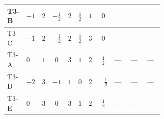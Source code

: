 \documentclass[8pt]{article}
\begin{document}
\begin{landscape}
\begin{longtable}{@{}llcccccc >{\raggedright\arraybackslash}p{0.21\linewidth} >{\raggedright\arraybackslash}p{0.21\linewidth} >{\raggedright\arraybackslash}p{0.21\linewidth}@{}}
T3-B & $-1$ & $2$ & $-\frac{1}{2}$ & $2$ & $\frac{1}{2}$ & $1$ & $0$ & \scriptsize\adjustbox{max width=\linewidth}{$\begin{gathered} 4 {\lambda_{H^\dagger H^\dagger S_1^\dagger S_1^\dagger}} \left({\lambda_{H^\dagger H^\dagger S_2 S_2}}\right)^{*}\end{gathered}$} & \scriptsize\adjustbox{max width=\linewidth}{$\begin{gathered} -9 {g_2}^2 {\lambda_{S_1^{\dagger 2}S_2^{\dagger 2}}}\end{gathered}$} & \scriptsize\adjustbox{max width=\linewidth}{$\begin{gathered} -3 {g_Y}^2 {\lambda_{S_1^{\dagger 2}S_2^{\dagger 2}}}\end{gathered}$} \\
\midrule
T3-C & $-1$ & $2$ & $-\frac{1}{2}$ & $2$ & $\frac{1}{2}$ & $3$ & $0$ & \scriptsize\adjustbox{max width=\linewidth}{$\begin{gathered} 4 {\lambda_{H^\dagger H^\dagger S_1^\dagger S_1^\dagger}} \left({\lambda_{H^\dagger H^\dagger S_2 S_2}}\right)^{*}\end{gathered}$} & \scriptsize\adjustbox{max width=\linewidth}{$\begin{gathered} -9 {g_2}^2 {\lambda_{S_1^{\dagger 2}S_2^{\dagger 2}}}\end{gathered}$} & \scriptsize\adjustbox{max width=\linewidth}{$\begin{gathered} -3 {g_Y}^2 {\lambda_{S_1^{\dagger 2}S_2^{\dagger 2}}}\end{gathered}$} \\
\midrule
T3-A & $0$ & $1$ & $0$ & $3$ & $1$ & $2$ & $\frac{1}{2}$ & --- & --- & --- \\
\midrule
T3-D & $-2$ & $3$ & $-1$ & $1$ & $0$ & $2$ & $-\frac{1}{2}$ & --- & --- & --- \\
\midrule
T3-E & $0$ & $3$ & $0$ & $3$ & $1$ & $2$ & $\frac{1}{2}$ & --- & --- & --- \\
\midrule
\bottomrule
\end{longtable}
\clearpage

\end{landscape}
\end{document}
